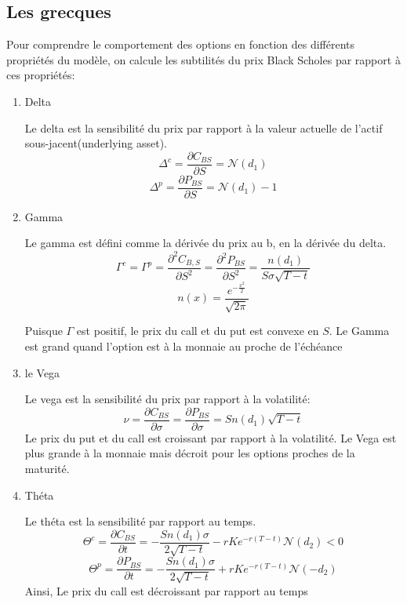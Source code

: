 \documentclass{article}
\theoremstyle{plain}
\theoremstyle{definition}
\begin{document}
\subsection{Les grecques}

Pour comprendre le comportement des options en fonction des diff\'erents propri\'et\'es du mod\`ele, on calcule les subtilit\'es du prix Black Scholes  par rapport \`a ces propri\'et\'es:
\begin{enumerate}
\item Delta

Le delta est la sensibilit\'e du prix par rapport \`a la valeur actuelle de l'actif sous-jacent(underlying asset).
\begin{equation}
\Delta^c = \frac{\partial C_{BS}}{\partial S}=\mathcal{N}(d_1)
\end{equation}
\begin{equation}
\Delta^p=\frac{\partial P_{BS}}{\partial S}=\mathcal{N}(d_1)-1
\end{equation}

\item Gamma

Le gamma est d\'efini comme la d\'eriv\'ee du prix au b, en la d\'eriv\'ee du delta.
\begin{equation}
\Gamma^c=\Gamma^p=\frac{\partial^2 C_{B,S}}{\partial S^2}=\frac{\partial^2 P_{BS}}{\partial S^2}=\frac{n(d_1)}{S\sigma\sqrt{T-t}}
\end{equation}
\begin{equation}
n(x)=\frac{e^{-\frac{x^2}{2}}}{\sqrt{2\pi}}
\end{equation}

Puisque $\Gamma$ est positif, le prix du call et du put est convexe en $S$. Le Gamma est grand quand l'option est \`a la monnaie au proche de l'\'ech\'eance

\item le Vega

Le vega est la sensibilit\'e du  prix par rapport \`a la volatilit\'e:
\begin{equation}
\nu=\frac{\partial C_{BS}}{\partial \sigma} = \frac{\partial P_{BS}}{\partial\sigma}=Sn(d_1)\sqrt{T-t}
\end{equation}
Le prix du put et du call est croissant par rapport \`a la volatilit\'e. Le Vega est plus grande \`a la monnaie mais d\'ecroit pour les options proches de la maturit\'e.

\item Th\'eta

Le th\'eta est la sensibilit\'e par rapport au temps.
\begin{equation}
\Theta^c=\frac{\partial C_{BS}}{\partial t}=-\frac{Sn(d_1)\sigma}{2\sqrt{T-t}}-rKe^{-r(T-t)}\mathcal{N}(d_2)<0
\end{equation}
\begin{equation}
\Theta^p=\frac{\partial P_{BS}}{\partial t}=-\frac{Sn(d_1)\sigma}{2\sqrt{T-t}}+rKe^{-r(T-t)}\mathcal{N}(-d_2)
\end{equation}
Ainsi, Le prix du call est d\'ecroissant par rapport au temps


\end{enumerate}
\end{document}

